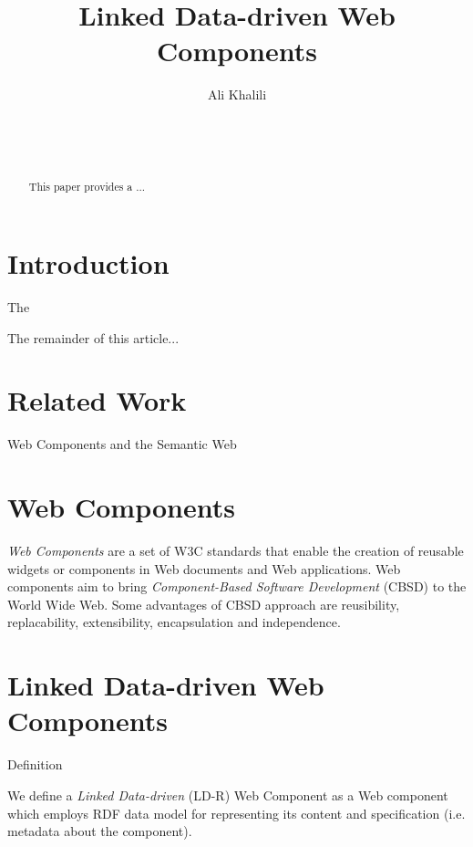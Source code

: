 \documentclass{acm_proc_article-sp}
\begin{document}
\title{Linked Data-driven Web Components}
\subtitle{}

\author{
\alignauthor
Ali Khalili\\
       \\
       \\
       \\
}


\maketitle
\begin{abstract}
This paper provides a ...

\end{abstract}


\section{Introduction}
The


The remainder of this article...

\section{Related Work}

Web Components and the Semantic Web~\cite{pahl2011}

\section{Web Components}
\emph{Web Components} are a set of W3C standards that enable the creation of reusable widgets or components in Web documents and Web applications.
Web components aim to bring \emph{Component-Based Software Development} (CBSD) to the World Wide Web.
Some advantages of CBSD approach are reusibility, replacability, extensibility, encapsulation and independence.

\section{Linked Data-driven Web Components}

Definition

We define a \emph{Linked Data-driven} (LD-R) Web Component as a Web component which employs RDF data model for representing its content and specification (i.e. metadata about the component).
\end{document}
